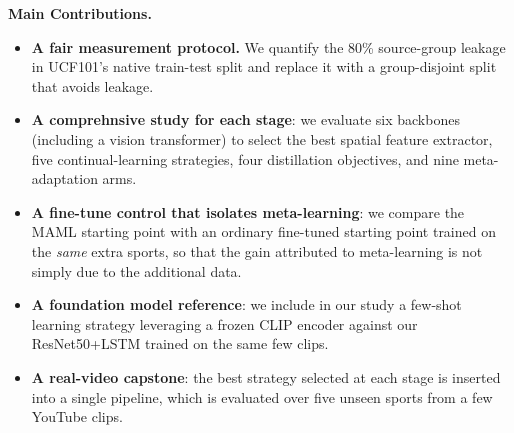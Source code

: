 \documentclass[conference]{IEEEtran}
\begin{document}
\textbf{Main Contributions.}
\begin{itemize}
\item \textbf{A fair measurement protocol.} We quantify the 80\% source-group leakage in UCF101's native train-test split and replace it with a group-disjoint split that avoids leakage.
\item \textbf{A comprehnsive study for each stage}: we evaluate six backbones (including a vision transformer) to select the best spatial feature extractor, five continual-learning
strategies, four distillation objectives, and nine meta-adaptation arms.
\item \textbf{A fine-tune control that isolates meta-learning}: we compare the MAML starting point with an ordinary
fine-tuned starting point trained on the \emph{same} extra sports, so that the gain attributed to meta-learning is not
simply due to the additional data.
\item \textbf{A foundation model reference}: we include in our study a few-shot learning strategy leveraging a frozen CLIP encoder against our ResNet50+LSTM trained on the same few clips.
\item \textbf{A real-video capstone}: the best strategy selected at each stage is inserted into a single
pipeline, which is evaluated over five unseen sports from a few YouTube clips.
\end{itemize}
\end{document}
